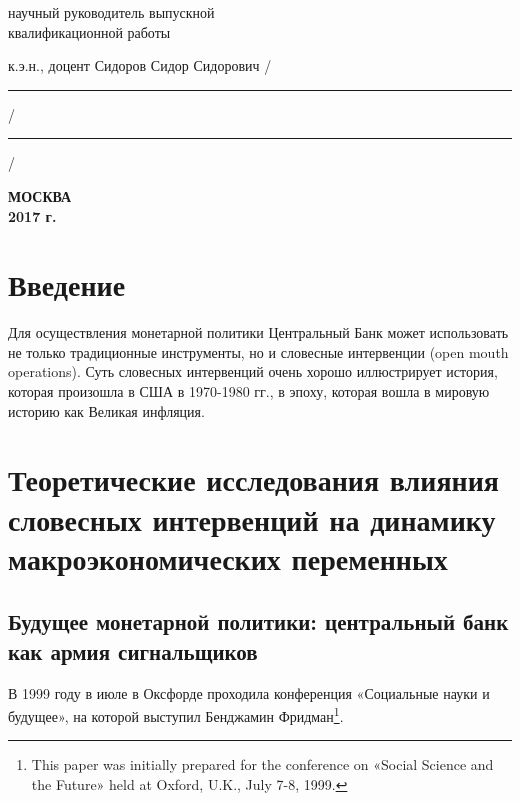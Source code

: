 \documentclass[12pt,a4paper, oneside]{extreport}
\begin{document}
\noindent
научный руководитель выпускной \\
квалификационной работы

\noindent
к.э.н., доцент Сидоров Сидор Сидорович
\hfill /\rule{6em}{0.5pt}/\rule{6em}{0.5pt}/

\hfill{}

%
%

\vfill

\begin{center}
\normalsize \bfseries МОСКВА \\ 2017 г.
\end{center}
\endgroup 




\tableofcontents  %




\chapter*{Введение}

Для осуществления монетарной политики Центральный Банк может использовать не только традиционные инструменты, но и словесные интервенции (open mouth operations). Суть словесных интервенций очень хорошо иллюстрирует история, которая произошла в США в 1970-1980 гг., в эпоху, которая вошла в мировую историю как Великая инфляция.


\chapter{Теоретические исследования влияния словесных интервенций на динамику макроэкономических переменных}

\section{Будущее монетарной политики: центральный банк как армия сигнальщиков}

В 1999 году в июле в Оксфорде проходила конференция «Социальные науки и будущее», на которой выступил Бенджамин Фридман\footnote{This paper was initially prepared for the conference on «Social Science and the Future» held at Oxford, U.K., July 7-8, 1999.}.
\end{document}
